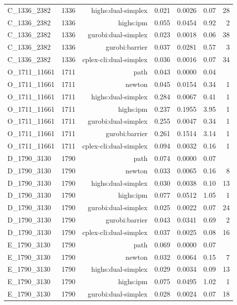 \begin{longtable}{lrrrrrr}
C\_1336\_2382 & 1336 & highs:dual-simplex & 0.021 & 0.0026 & 0.07 & 28 \\
C\_1336\_2382 & 1336 & highs:ipm & 0.055 & 0.0454 & 0.92 & 2 \\
C\_1336\_2382 & 1336 & gurobi:dual-simplex & 0.023 & 0.0018 & 0.06 & 38 \\
C\_1336\_2382 & 1336 & gurobi:barrier & 0.037 & 0.0281 & 0.57 & 3 \\
C\_1336\_2382 & 1336 & cplex-cli:dual-simplex & 0.036 & 0.0016 & 0.07 & 34 \\
O\_1711\_11661 & 1711 & path & 0.043 & 0.0000 & 0.04 &  \\
O\_1711\_11661 & 1711 & newton & 0.045 & 0.0154 & 0.34 & 1 \\
O\_1711\_11661 & 1711 & highs:dual-simplex & 0.284 & 0.0067 & 0.41 & 1 \\
O\_1711\_11661 & 1711 & highs:ipm & 0.237 & 0.1955 & 3.95 & 1 \\
O\_1711\_11661 & 1711 & gurobi:dual-simplex & 0.255 & 0.0047 & 0.34 & 1 \\
O\_1711\_11661 & 1711 & gurobi:barrier & 0.261 & 0.1514 & 3.14 & 1 \\
O\_1711\_11661 & 1711 & cplex-cli:dual-simplex & 0.094 & 0.0032 & 0.16 & 1 \\
D\_1790\_3130 & 1790 & path & 0.074 & 0.0000 & 0.07 &  \\
D\_1790\_3130 & 1790 & newton & 0.033 & 0.0065 & 0.16 & 8 \\
D\_1790\_3130 & 1790 & highs:dual-simplex & 0.030 & 0.0038 & 0.10 & 13 \\
D\_1790\_3130 & 1790 & highs:ipm & 0.077 & 0.0512 & 1.05 & 1 \\
D\_1790\_3130 & 1790 & gurobi:dual-simplex & 0.025 & 0.0022 & 0.07 & 24 \\
D\_1790\_3130 & 1790 & gurobi:barrier & 0.043 & 0.0341 & 0.69 & 2 \\
D\_1790\_3130 & 1790 & cplex-cli:dual-simplex & 0.037 & 0.0025 & 0.08 & 16 \\
E\_1790\_3130 & 1790 & path & 0.069 & 0.0000 & 0.07 &  \\
E\_1790\_3130 & 1790 & newton & 0.032 & 0.0064 & 0.15 & 7 \\
E\_1790\_3130 & 1790 & highs:dual-simplex & 0.029 & 0.0034 & 0.09 & 13 \\
E\_1790\_3130 & 1790 & highs:ipm & 0.075 & 0.0495 & 1.02 & 1 \\
E\_1790\_3130 & 1790 & gurobi:dual-simplex & 0.028 & 0.0024 & 0.07 & 18 \\

\end{longtable}
